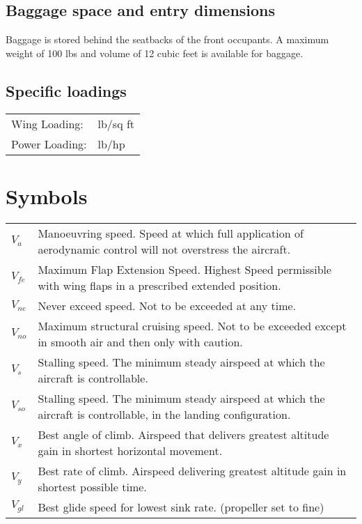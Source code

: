 \subsection{Baggage space and entry dimensions}
Baggage is stored behind the seatbacks of the front occupants.  A maximum weight of 100 lbs and volume of 12 cubic feet is available for baggage.

\subsection{Specific loadings}
  \begin{tabularx}{\linewidth}{
    >{\hsize=0.4\hsize}X
    >{\hsize=0.6\hsize}X  }
Wing Loading: & 14.8 lb/sq ft\\
Power Loading: & 9.0 lb/hp \\
\end{tabularx}

\section{Symbols}
  \begin{tabularx}{\linewidth}{
    >{\hsize=0.2\hsize}X
    >{\hsize=0.8\hsize}X  }
$V_{a}$    & Manoeuvring speed. Speed at which full application of aerodynamic control will not overstress the aircraft. \\
$V_{fe}$ & Maximum Flap Extension Speed. Highest Speed permissible with wing flaps in a prescribed extended position. \\
$V_{ne}$ & Never exceed speed. Not to be exceeded at any time. \\
$V_{no}$ & Maximum structural cruising speed. Not to be exceeded except in smooth air and then only with caution.\\ 
$V_{s}$  & Stalling speed. The minimum steady airspeed at which the aircraft is controllable. \\
$V_{so}$ & Stalling speed. The minimum steady airspeed at which the aircraft is controllable, in the landing configuration. \\
$V_{x}$  & Best angle of climb. Airspeed that delivers greatest altitude gain in shortest horizontal movement. \\
$V_{y}$  & Best rate of climb. Airspeed delivering greatest altitude gain in shortest possible time.\\
$V_{gl}$ & Best glide speed for lowest sink rate. (propeller set to fine)\\
\end{tabularx}

